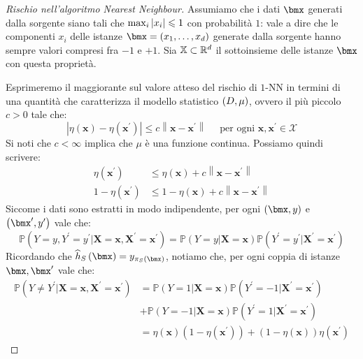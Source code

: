 \documentclass[\main/main.tex]{subfiles}
\begin{document}
\begin{proof}[Rischio nell'algoritmo Nearest Neighbour]
        Assumiamo che i dati \(\bmx\) generati dalla sorgente siano tali che \(\max_i \left\lvert x_i\right\rvert \leqslant 1\) con probabilità \(1\): vale a dire che le componenti \(x_i\) delle istanze \(\bmx = \rnd{x_1, \ldots, x_d}\) generate dalla sorgente hanno sempre valori compresi fra \(-1\) e \(+1\). Sia \(\mathbb{X} \subset \mathbb{R}^d\) il sottoinsieme delle istanze \(\bmx\) con questa proprietà. 
        
        Esprimeremo il maggiorante sul valore atteso del rischio di \(1\)-NN in termini di una quantità che caratterizza il modello statistico \(\left(D, \mu\right)\), ovvero il più piccolo \(c>0\) tale che:
        \[
            \left|\eta(\boldsymbol{x})-\eta\left(\boldsymbol{x}^{\prime}\right)\right| \leq c\left\|\boldsymbol{x}-\boldsymbol{x}^{\prime}\right\| \quad \text { per ogni } \boldsymbol{x}, \boldsymbol{x}^{\prime} \in \mathcal{X}
        \]
        Si noti che \(c<\infty\) implica che \(\mu\) è una funzione continua. Possiamo quindi scrivere:
        \begin{align*}
            \eta\left(\boldsymbol{x}^{\prime}\right) & \leq \eta(\boldsymbol{x})+c\left\|\boldsymbol{x}-\boldsymbol{x}^{\prime}\right\| \\ 1-\eta\left(\boldsymbol{x}^{\prime}\right) & \leq 1-\eta(\boldsymbol{x})+c\left\|\boldsymbol{x}-\boldsymbol{x}^{\prime}\right\|
        \end{align*}
        Siccome i dati sono estratti in modo indipendente, per ogni \(\rnd{\bmx, y}\) e \(\rnd{\bmx', y'}\) vale che:
        \[
            \mathbb{P}\left(Y=y, Y^{\prime}=y^{\prime} | \boldsymbol{X}=\boldsymbol{x}, \boldsymbol{X}^{\prime}=\boldsymbol{x}^{\prime}\right)=\mathbb{P}(Y=y | \boldsymbol{X}=\boldsymbol{x}) \mathbb{P}\left(Y^{\prime}=y^{\prime} | \boldsymbol{X}^{\prime}=\boldsymbol{x}^{\prime}\right)
        \]
        Ricordando che \(\hat{h}_S\rnd{\bmx} = y_{\pi_S\rnd{\bmx}}\), notiamo che, per ogni coppia di istanze \(\bmx, \bmx'\) vale che:
        \begin{align*}
            \mathbb{P}\left(Y \neq Y^{\prime} | \boldsymbol{X}=\boldsymbol{x}, \boldsymbol{X}^{\prime}=\boldsymbol{x}^{\prime}\right) &=\mathbb{P}(Y=1 | \boldsymbol{X}=\boldsymbol{x}) \mathbb{P}\left(Y^{\prime}=-1 | \boldsymbol{X}^{\prime}=\boldsymbol{x}^{\prime}\right) \\ &+\mathbb{P}(Y=-1 | \boldsymbol{X}=\boldsymbol{x}) \mathbb{P}\left(Y^{\prime}=1 | \boldsymbol{X}^{\prime}=\boldsymbol{x}^{\prime}\right) \\ &=\eta(\boldsymbol{x})\left(1-\eta\left(\boldsymbol{x}^{\prime}\right)\right)+(1-\eta(\boldsymbol{x})) \eta\left(\boldsymbol{x}^{\prime}\right)

\end{align*}
\end{proof}
\end{document}
